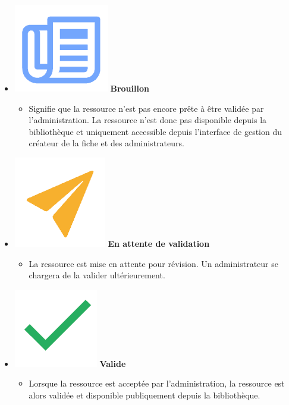 \begin{itemize}
    \item \includegraphics[valign=b,height=1.4\fontcharht\font`X]{images/client/draft.png} \textbf{Brouillon}
    \begin{itemize}
        \item Signifie que la ressource n'est pas encore prête à être validée par l'administration. La ressource n'est donc pas disponible depuis la bibliothèque et uniquement accessible depuis l'interface de gestion du créateur de la \gls{fiche} et des administrateurs.
    \end{itemize}
    \item \includegraphics[valign=b,height=1.4\fontcharht\font`X]{images/client/pending.png} \textbf{En attente de validation}
    \begin{itemize}
        \item La ressource est mise en attente pour révision. Un administrateur se chargera de la valider ultérieurement.
    \end{itemize}
    \item \includegraphics[valign=b,height=1.4\fontcharht\font`X]{images/client/validated.png} \textbf{Valide}
    \begin{itemize}
        \item Lorsque la ressource est acceptée par l'administration, la ressource est alors validée et disponible publiquement depuis la bibliothèque.

\end{itemize}
\end{itemize}
